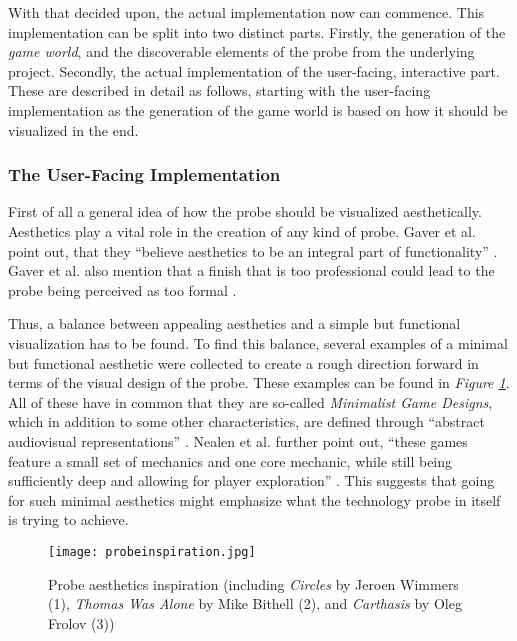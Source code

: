 With that decided upon, the actual implementation now can commence. This implementation can be split into two distinct parts. Firstly, the generation of the \textit{game world}, and the discoverable elements of the probe from the underlying project. Secondly, the actual implementation of the user-facing, interactive part. These are described in detail as follows, starting with the user-facing implementation as the generation of the game world is based on how it should be visualized in the end.

\subsubsection{The User-Facing Implementation}

First of all a general idea of how the probe should be visualized aesthetically. Aesthetics play a vital role in the creation of any kind of probe. Gaver et al. point out, that they \enquote{believe aesthetics to be an integral part of functionality} \cite[p. 25]{gaver1999design}. Gaver et al. also mention that a finish that is too professional could lead to the probe being perceived as too formal \cite{gaver1999design}.

Thus, a balance between appealing aesthetics and a simple but functional visualization has to be found. To find this balance, several examples of a minimal but functional aesthetic were collected to create a rough direction forward in terms of the visual design of the probe. These examples can be found in \textit{Figure \ref{fig:probeinspiration}}. All of these have in common that they are so-called \textit{Minimalist Game Designs}, which in addition to some other characteristics, are defined through \enquote{abstract audiovisual representations} \cite[p. 38]{nealen2011towards}. Nealen et al. further point out, \enquote{these games feature a small set of mechanics and one core mechanic, while still being sufficiently deep and allowing for player exploration} \cite[p. 38]{nealen2011towards}. This suggests that going for such minimal aesthetics might emphasize what the technology probe in itself is trying to achieve.

\begin{figure}[h]
  \centering
  \texttt{[image: probeinspiration.jpg]}
  \caption{Probe aesthetics inspiration (including \textit{Circles} \cite{circles2017} by Jeroen Wimmers (1), \textit{Thomas Was Alone} \cite{thomas2015} by Mike Bithell (2), and \textit{Carthasis} \cite{dribble2021} by Oleg Frolov (3))}
  \label{fig:probeinspiration}
\end{figure}

